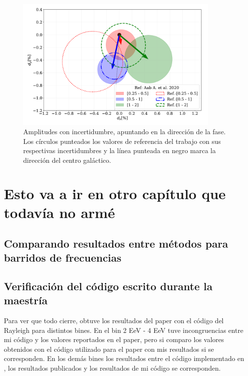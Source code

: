 \begin{figure}[H]
    \begin{small}
        \begin{center}
            \includegraphics[width=0.9\textwidth]{comparando_sigmas_v3.pdf}
        \end{center}
        \caption{Amplitudes con incertidumbre, apuntando en la dirección  de la fase. Los círculos punteados los valores de referencia del trabajo \cite{Aab_2020} con sus respectivas incertidumbres y la línea punteada en negro marca la dirección del centro galáctico.}
        \label{fig:incertidumbre}
    \end{small}
\end{figure}


\chapter{Esto va a ir en otro capítulo que todavía no armé}
\section{Comparando resultados entre métodos para barridos de frecuencias}

\section{Verificación del código escrito durante la maestría}

Para ver que todo cierre, obtuve los resultados del paper \cite{Aab_2020} con el código del Rayleigh para distintos bines. En el bin  2 EeV - 4 EeV  tuve incongruencias entre mi código y los valores reportados en el paper, pero si comparo los valores obtenidos con el código utilizado para el paper con mis resultados si se corresponden. En los demás bines los resultados entre el código implementado en \cite{Aab_2020}, los resultados publicados y los resultados de mi código se corresponden.


